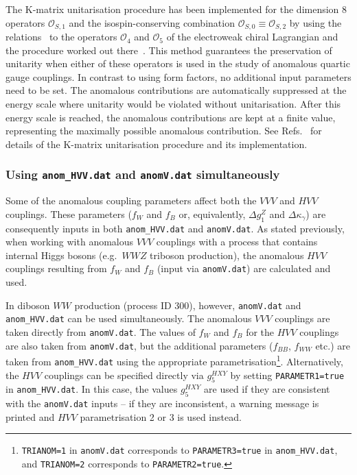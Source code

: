 \documentclass[english,12pt]{article}
\begin{document}
The K-matrix unitarisation procedure has been implemented 
for the dimension 8 operators $\mathcal{O}_{S,1}$ and the isospin-conserving
combination $\mathcal{O}_{S,0}\equiv\mathcal{O}_{S,2}$
by using the relations~\cite{Rauch:2016pai} to the operators $\mathcal{O}_4$
and $\mathcal{O}_5$ of the electroweak chiral Lagrangian and the procedure
worked out there~\cite{Alboteanu:2008my}.
This method guarantees the preservation of unitarity when either of these operators is used 
in the study of anomalous quartic gauge couplings. In contrast to using form factors,
no additional input parameters need to be set. The anomalous contributions are automatically suppressed
at the energy scale where unitarity would be violated without unitarisation. After this energy scale is reached,
the anomalous contributions are kept at a finite value, representing the maximally possible anomalous contribution.
See Refs.~\cite{Alboteanu:2008my,Degrande:2013rea,Kmatrix,Kilian:2014zja,Rauch:2016pai}
for details of the K-matrix unitarisation procedure and its implementation.


\subsubsection{Using {\tt anom\_HVV.dat} and {\tt anomV.dat} simultaneously}
\label{sec:HVVandVVV}

Some of the anomalous coupling parameters affect both the $VVV$ and $HVV$ couplings.  
These parameters ($f_{W}$ and $f_{B}$ or, equivalently, $\Delta g_{1}^{Z}$ and 
$\Delta \kappa_{\gamma}$) are consequently inputs in both {\tt anom\_HVV.dat} 
and {\tt anomV.dat}.  As stated previously, when working with anomalous $VVV$ 
couplings with a process that contains internal Higgs bosons (e.g.\ $WWZ$ triboson production), 
the anomalous $HVV$ couplings resulting from $f_{W}$ and $f_{B}$ (input 
via {\tt anomV.dat}) are calculated and used.

In diboson $WW$ production (process ID 300), however, {\tt anomV.dat} and {\tt anom\_HVV.dat} 
can be used simultaneously.  The anomalous $VVV$ couplings are taken directly from {\tt anomV.dat}.  
The values of $f_{W}$ and $f_{B}$ for the $HVV$ couplings are also taken from {\tt anomV.dat}, 
but the additional parameters ($f_{BB}$, $f_{WW}$ etc.) are taken from {\tt anom\_HVV.dat} 
using the appropriate parametrisation\footnote{{\tt TRIANOM=1} in {\tt anomV.dat} corresponds 
to {\tt PARAMETR3=true} in {\tt anom\_HVV.dat}, and {\tt TRIANOM=2} corresponds to {\tt PARAMETR2=true}.}. 
 Alternatively, the $HVV$ couplings can be specified directly via $g_{5}^{HXY}$ by setting 
{\tt PARAMETR1=true} in {\tt anom\_HVV.dat}.  In this case, the values $g_{5}^{HXY}$ are used if 
they are consistent with the {\tt anomV.dat} inputs -- if they are inconsistent, a warning message 
is printed and $HVV$ parametrisation 2 or 3 is used instead.
\end{document}
